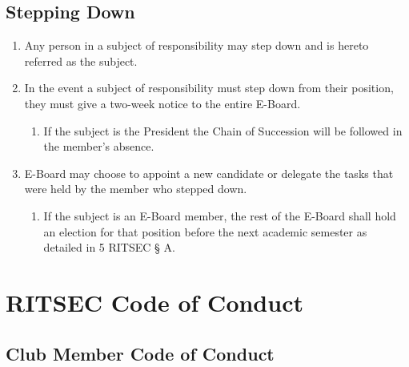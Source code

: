 \documentclass{article}
\begin{document}
\subsection{Stepping Down}

\begin{enumerate}
  \item Any person in a subject of responsibility may step down and is hereto
    referred as the subject.
  \item In the event a subject of responsibility must step down from their
    position, they must give a two-week notice to the entire E-Board.
  \begin{enumerate}
    \item If the subject is the President the Chain of Succession will be
      followed in the member’s absence.
  \end{enumerate}
  \item E-Board may choose to appoint a new candidate or delegate the tasks
    that were held by the member who stepped down.
  \begin{enumerate}
    \item If the subject is an E-Board member, the rest of the E-Board shall
      hold an election for that position before the next academic semester as
      detailed in 5 RITSEC § A.
  \end{enumerate}
\end{enumerate}


\section{RITSEC Code of Conduct}

\subsection{Club Member Code of Conduct}
\end{document}

